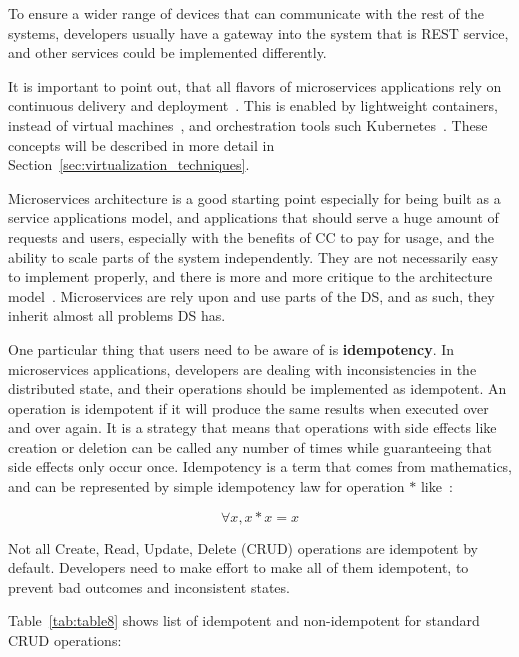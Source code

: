 \noindent
To ensure a wider range of devices that can communicate with the rest of the systems, developers usually have a gateway into the system that is REST service, and other services could be implemented differently.

It is important to point out, that all flavors of microservices applications rely on continuous delivery and deployment~\cite{7436659}. This is enabled by lightweight containers, instead of virtual machines~\cite{FelterFRR15}, and orchestration tools such Kubernetes~\cite{BurnsGOBW16}. These concepts will be described in more detail in Section~\ref{sec:virtualization_techniques}.

Microservices architecture is a good starting point especially for being built as a service applications model, and applications that should serve a huge amount of requests and users, especially with the benefits of CC to pay for usage, and the ability to scale parts of the system independently.  They are not necessarily easy to implement properly, and there is more and more critique to the architecture model~\cite{SoldaniTH18}. Microservices are rely upon and use parts of the DS, and as such, they inherit almost all problems DS has. 

One particular thing that users need to be aware of is \textbf{idempotency}. In microservices applications, developers are dealing with inconsistencies in the distributed state, and their operations should be implemented as idempotent. An operation is idempotent if it will produce the same results when executed over and over again. It is a strategy that means that operations with side effects like creation or deletion can be called any number of times while guaranteeing that side effects only occur once. Idempotency is a term that comes from mathematics, and can be represented by simple idempotency law for operation $*$ like~\cite{gratzer2002general}:

\begin{equation}\label{form:idempotency_law}
\forall x, x * x = x
\end{equation}

\noindent
Not all Create, Read, Update, Delete (CRUD) operations are idempotent by default. Developers need to make effort to make all of them idempotent, to prevent bad outcomes and inconsistent states. 

Table~\ref{tab:table8} shows list of idempotent and non-idempotent for standard CRUD operations:

